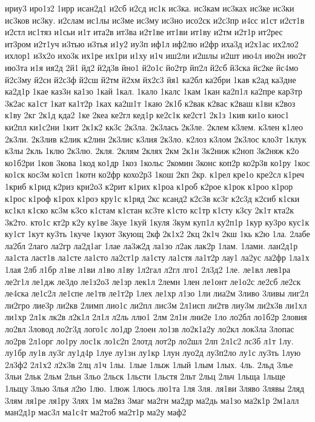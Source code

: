 ириу3
иро1з2
1ирр
исан2д1
и2сб
и2сд
ис1к
ис3ка.
ис3кам
ис3ках
ис3ке
ис3ки
ис3ков
ис3ку.
и2слам
ис1лы
ис3ме
ис3му
ис3но
исо2ск
и2с3пр
и4сс
и1ст
и2ст1в
и2стл
ис1тяз
и1сьи
и1т
ита2в
ит3ва
и2т1ве
ит1ви
ит1ву
и2тм
и2т1р
ит2рес
ит3ром
и2т1уч
и3тью
и3тья
и1у2
иу3п
иф1л
иф2лю
и2фр
иха3д
и2х1ас
их2ло2
ихлор1
и3х2о
ихо3к
их1ре
их1ри
и1ху
и1ч
иш2ли
и2шлы
и2шт
ию4л
ию2н
ию2т
ию3та
и1я
ия2д
2й1
йд2
й2д3в
йно1
й2о1с
йо2тр
йп2л
й2сб
й3ска
йс2ке
йс4мо
й2с3му
й2сн
й2с3ф
й2сш
й2тм
й2хм
йх2с3
йя1
ка2бл
ка2бри
1кав
к2ад
ка3дне
ка2д1р
1кае
каз3н
ка1зо
1кай
1кал.
1кало
1калс
1кам
1кан
ка2п1л
ка2пре
кар3тр
3к2ас
ка1ст
1кат
ка1т2р
1ках
ка2ш1т
1каю
2к1б
к2вак
к2вас
к2ваш
к1ви
к2воз
к1ву
2кг
2к1д
кда2
1ке
2кеа
ке2гл
кед1р
ке2с1к
ке2ст1
2к1з
1кив
ки1о
киос1
ки2пл
ки1с2ни
1кит
2к1к2
кк3с
2к3ла.
2к3лась
2к3ле.
2клем
к3лем.
к3лен
к1лео
2к3ли.
2к3лив
к2лик
к2лин
2к3лис
к3лия
2к3ло.
к2лоз
к3лом
2к3лос
кло3т
1клук
к3лы
2кль
1клю
2к3лю.
2кля.
2клям
2клях
2км
2к1н
3к2ниж
к2ноп
3к2няж
к2о
ко1б2ри
1ков
3кова
1код
ко1др
1коз
1кольс
2комин
3конс
коп2р
ко2р3в
ко1ру
1кос
ко1ск
кос3м
ко1сп
1котн
ко2фр
кохо2р3
1кош
2кп
2кр.
к1рел
кре1о
кре2сл
к1реч
1криб
к1рид
к2риз
кри2о3
к2рит
к1рих
к1роа
к1роб
к2рое
к1рок
к1роо
к1рор
к1рос
к1роф
к1рох
к1роэ
кру1с
к1ряд
2кс
ксанд2
к2с3в
кс3г
к2с3д
к2сиб
к1ски
кс1кл
к1ско
кс3м
к3со
к1стам
к1стан
кс3те
к1сто
кс1тр
к1сту
к3су
2к1т
кта2к
3к2то.
кто1с
кт2р
к2у
ку1ве
3куе
1куй
1куля
3кум
куп1л
ку2п1р
1кур
ку3ро
кус1к
ку1ст
1кут
ку3ть
1куче
1куют
3кующ
2кф
2к1х2
2кц
2к1ч
2кш
1кь
к2ю
1ла.
2лабе
ла2бл
2лаго
ла2гр
ла2д1аг
1лае
ла3ж2д
ла1зо
л2ак
лак2р
1лам.
1лами.
лан2д1р
ла1ста
ласт1в
ла1сте
ла1сто
ла2ст1р
ла1сту
ла1стя
ла1т2р
лау1
ла2ус
ла2фр
1ла1х
1лая
2лб
л1бр
л1ве
л1ви
л1во
л1ву
1л2гал
л2гл
лго1
2л3д2
1ле.
ле1вл
лев1ра
ле2г1л
ле1дж
ле3до
ле1з2о3
ле1зр
лек1л
2лемн
1лен
ле1онт
ле1о2с
ле2сб
ле2ск
ле4ска
ле1с2л
ле1спе
ле1тв
ле1т2р
1лех
ле1хр
л1зо
1ли
лиа2м
3ливо
3ливы
лиг2л
ли2гро
лие3р
ли2кв
2лимп
лио1с
ли2пл
лис3м
2л1исп
ли2тв
лиу3м
ли2х3в
ли1хл
ли1хр
2л1к
лк2в
л2к1л
2л1л
л2ль
ллю1
2лм
2л1н
лни2е
1ло
ло2бл
ло1б2р
2ловия
ло2вл
3ловод
ло2г3д
лого1с
ло1др
2лоен
ло1зв
ло2к1а2у
ло2кл
лок3ла
3лопас
ло2рв
2л1орг
ло1ру
лос1к
ло1с2п
2лотд
лот2р
ло2шл
2лп
2л1с2
лс3б
л1т
1лу.
лу1бр
лу1в
лу3г
лу1д4р
1луе
лу1зн
лу1кр
1лун
луо2д
лу3п2ло
лу1с
лу3ть
1лую
2л3ф2
2л1х2
л2х3в
2лц
л1ч
1лы.
1лые
1лыж
1лый
1лым
1лых.
4ль.
2льд
3лье
3льи
2льк
2льм
2льн
3льо
2льск
1льсти
1льстя
2льт
2льц
2льч
1льща
1льще
1льщу
3лью
3лья
л2ю
1лю.
1люж
1люсь
лю1та
1ля
3ля.
ля1ви
3ляво
3лявы
2ляд
3лям
ля1ре
ля1ру
3лях
1м
ма2вз
3маг
ма2гн
ма2др
ма2дь
ма1зо
ма2к1р
2м1алл
ман2д1р
мас3л
ма1с4т
ма2тоб
ма2т1р
ма2у
маф2
